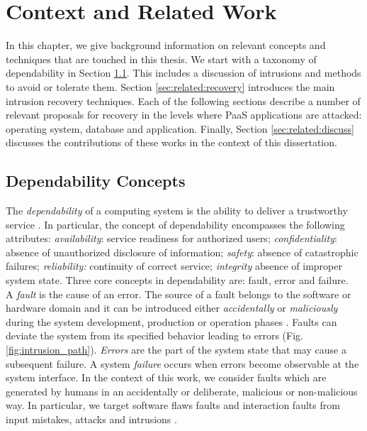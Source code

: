 \chapter{Context and Related Work}
\label{chapter:related_work}
In this chapter, we give background information on relevant concepts and techniques that are touched in this thesis. We start with a taxonomy of dependability in Section \ref{sec:related:dependability_concepts}. This includes a discussion of intrusions and methods to avoid or tolerate them. Section \ref{sec:related:recovery} introduces the main intrusion recovery techniques. Each of the following sections describe a number of relevant proposals for recovery in the levels where \ac{PaaS} applications are attacked: operating system, database and application. Finally, Section \ref{sec:related:discuss} discusses the contributions of these works in the context of this dissertation.

\section{Dependability Concepts}
\label{sec:related:dependability_concepts}
The \emph{dependability} of a computing system is the ability to deliver a trustworthy service \cite{Aviz}. In particular, the concept of dependability encompasses the following attributes: \emph{availability}: service readiness for authorized users; \emph{confidentiality}: absence of unauthorized disclosure of information; \emph{safety}: absence of catastrophic failures; \emph{reliability:} continuity of correct service; \emph{integrity} absence of improper system state. Three core concepts in dependability are: fault, error and failure.\\

A \emph{fault} is the cause of an error. The source of a fault belongs to the software or hardware domain and it can be introduced either \emph{accidentally} or \emph{maliciously} during the system development, production or operation phases \cite{Landwehr1992,Aviz}. Faults can deviate the system from its specified behavior leading to errors (Fig. \ref{fig:intrusion_path}). \emph{Errors} are the part of the system state that may cause a subsequent failure. A system \emph{failure} occurs when errors become observable at the system interface. In the context of this work, we consider faults which are generated by humans in an accidentally or deliberate, malicious or non-malicious way. In particular, we target software flaws faults and interaction faults from input mistakes, attacks and intrusions \cite{Aviz}. \\  

